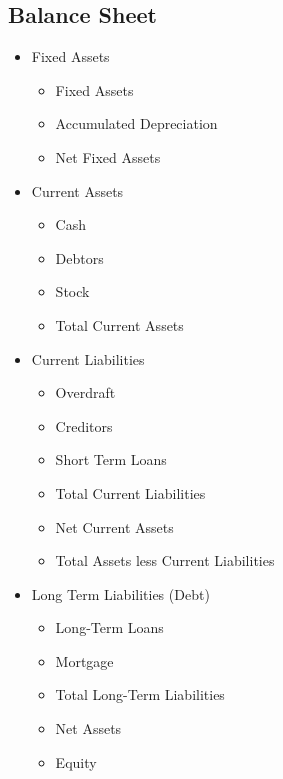 \documentclass{standalone}
\begin{document}
\subsection{Balance Sheet}
\begin{itemize}
    \item Fixed Assets
        \begin{itemize}
            \item Fixed Assets
            \item Accumulated Depreciation
            \item Net Fixed Assets
        \end{itemize}
    \item Current Assets
        \begin{itemize}
            \item Cash
            \item Debtors
            \item Stock
            \item Total Current Assets
        \end{itemize}
    \item Current Liabilities
        \begin{itemize}
            \item Overdraft
            \item Creditors
            \item Short Term Loans
            \item Total Current Liabilities
            \item Net Current Assets
            \item Total Assets less Current Liabilities
        \end{itemize}
    \item Long Term Liabilities (Debt)
        \begin{itemize}
            \item Long-Term Loans
            \item Mortgage
            \item Total Long-Term Liabilities
            \item Net Assets
            \item Equity
        \end{itemize}
\end{itemize}
\end{document}
